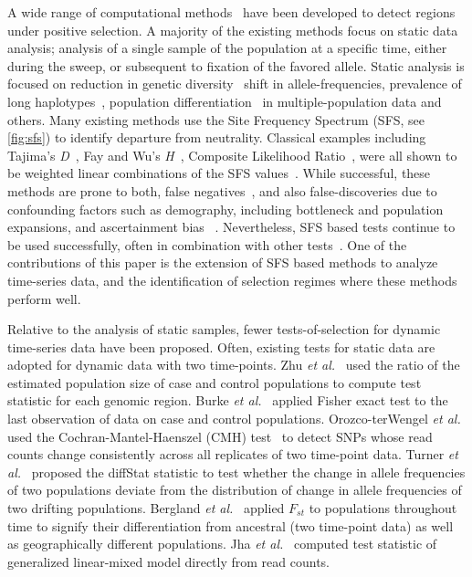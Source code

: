 A wide range of computational methods~\cite{vitti2013detecting} have
been developed to detect regions under positive selection. A majority
of the existing methods focus on static data analysis; analysis of a
single sample of the population at a specific time, either during the
sweep, or subsequent to fixation of the favored allele. Static
analysis is focused on reduction in genetic
diversity~\cite{tajima1989statistical,fay2000hitchhiking,ronen2013learning,garud2015recent}
shift in allele-frequencies, prevalence of long
haplotypes~\cite{sabeti2006positive,vitti2013detecting}, population
differentiation~\cite{holsinger2009genetics,burke2010genome,gunther2013robust}
in
multiple-population data and others. Many existing methods use the
Site Frequency Spectrum (SFS, see \ref{fig:sfs}) to
identify departure from neutrality. Classical examples including
Tajima's \emph{D}~\cite{tajima1989statistical}, Fay and Wu's
\emph{H}~\cite{fay2000hitchhiking}, Composite Likelihood
Ratio~\cite{nielsen2005genomic}, were all shown to be weighted linear
combinations of the SFS values~\cite{achaz2009frequency}.  While
successful, these methods are prone to both, false
negatives~\cite{messer2013population}, and also false-discoveries due
to confounding factors such as demography, including bottleneck and
population expansions, and ascertainment bias ~\cite{ptak2002evidence,
  ramos2002statistical,akey2009constructing,
  nielsen2003correcting,messer2013population}. Nevertheless, SFS based
tests continue to be used successfully, often in combination with
other tests~\cite{akey2009constructing,vitti2013detecting}. One of the
contributions of this paper is the extension of SFS based methods to
analyze time-series data, and the identification of selection regimes
where these methods perform well.

Relative to the analysis of static samples, fewer tests-of-selection
for dynamic time-series data have been proposed. Often, existing tests
for static data are adopted for dynamic data with two time-points. Zhu
\emph{et al.}~\cite{zhou2011experimental} used the ratio of the estimated
population size of case and control populations to compute test
statistic for each genomic region. Burke \emph{et
 al.}~\cite{burke2010genome} applied Fisher exact test to the last
observation of data on case and control 
populations. Orozco-terWengel
\emph{et al.}~\cite{orozco2012adaptation} used the
Cochran-Mantel-Haenszel (CMH) test~\cite{agresti2011categorical} to
detect SNPs whose read counts change consistently across all
replicates of two time-point data. Turner \emph{et
 al.}~\cite{turner2011population} proposed the diffStat statistic to
test whether the change in allele frequencies of two populations
deviate from the distribution of change in allele frequencies of two
drifting populations. Bergland \emph{et
 al.}~\cite{bergland2014genomic} applied $F_{st}$ to populations
throughout time to signify their differentiation from ancestral (two
time-point data) as well as geographically different populations. Jha
\emph{et al.}~\cite{jha2015whole} computed test statistic of
generalized linear-mixed model directly from read counts. 

